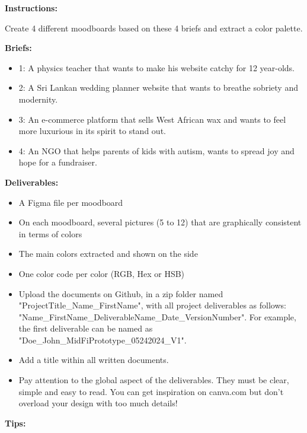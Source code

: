 \makeheaderfiles

\textbf{Instructions:}

Create 4 different moodboards based on these 4 briefs and extract a color palette.

\textbf{Briefs:}

\begin{itemize}
\item 1: A physics teacher that wants to make his website catchy for 12 year-olds.
\item 2: A Sri Lankan wedding planner website that wants to breathe sobriety and modernity.
\item 3: An e-commerce platform that sells West African wax and wants to feel more luxurious in its spirit to stand out.
\item 4: An NGO that helps parents of kids with autism, wants to spread joy and hope for a fundraiser.
\end{itemize}

\textbf{Deliverables:}

\begin{itemize}
\item A Figma file per moodboard
\item On each moodboard, several pictures (5 to 12) that are graphically consistent in terms of colors
\item The main colors extracted and shown on the side
\item One color code per color (RGB, Hex or HSB)
\item Upload the documents on Github, in a zip folder named "ProjectTitle\_Name\_FirstName", with all project deliverables as follows: "Name\_FirstName\_DeliverableName\_Date\_VersionNumber".  For example, the first deliverable can be named as "Doe\_John\_MidFiPrototype\_05242024\_V1".
\item Add a title within all written documents.
\item Pay attention to the global aspect of the deliverables. They must be clear, simple and easy to read. You can get inspiration on canva.com but don't overload your design with too much details!
\end{itemize}

\textbf{Tips:}

